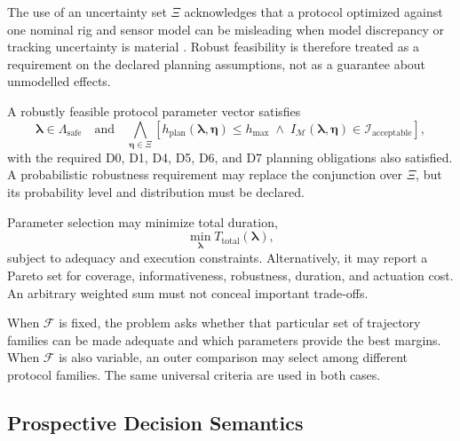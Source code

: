 \documentclass[11pt,a4paper]{article}
\begin{document}
The use of an uncertainty set $\Xi$ acknowledges that a protocol optimized
against one nominal rig and sensor model can be misleading when model
discrepancy or tracking uncertainty is material \cite{hu2017}. Robust
feasibility is therefore treated as a requirement on the declared planning
assumptions, not as a guarantee about unmodelled effects.

A robustly feasible protocol parameter vector satisfies
\begin{equation}
    \boldsymbol{\lambda}
    \in
    \Lambda_{\mathrm{safe}}
    \quad\text{and}\quad
    \bigwedge_{\boldsymbol{\eta}\in\Xi}
    \left[
        h_{\mathrm{plan}}
        \left(
            \boldsymbol{\lambda},
            \boldsymbol{\eta}
        \right)
        \leq h_{\max}
        \;\land\;
        I_{\mathcal{M}}
        \left(
            \boldsymbol{\lambda},
            \boldsymbol{\eta}
        \right)
        \in
        \mathcal{I}_{\mathrm{acceptable}}
    \right],
\end{equation}
with the required D0, D1, D4, D5, D6, and D7 planning obligations also
satisfied. A probabilistic robustness requirement may replace the conjunction
over $\Xi$, but its probability level and distribution must be declared.

Parameter selection may minimize total duration,
\begin{equation}
    \min_{\boldsymbol{\lambda}}
    T_{\mathrm{total}}
    \left(
        \boldsymbol{\lambda}
    \right),
\end{equation}
subject to adequacy and execution constraints. Alternatively, it may report a
Pareto set for coverage, informativeness, robustness, duration, and actuation
cost. An arbitrary weighted sum must not conceal important trade-offs.

When $\mathcal{F}$ is fixed, the problem asks whether that particular set of
trajectory families can be made adequate and which parameters provide the
best margins. When $\mathcal{F}$ is also variable, an outer comparison may
select among different protocol families. The same universal criteria are used
in both cases.

\subsection{Prospective Decision Semantics}
\end{document}
